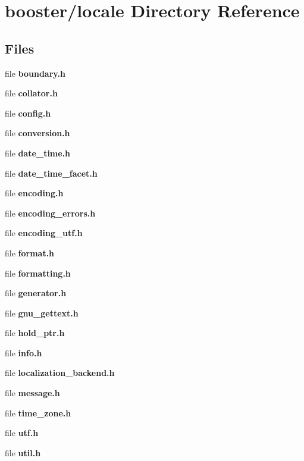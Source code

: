 \section{booster/locale Directory Reference}
\label{dir_16b7a13c3ac6af906251fa16860d5b07}
\subsection*{Files}
\begin{DoxyCompactItemize}
\item 
file {\bfseries boundary.\-h}
\item 
file {\bfseries collator.\-h}
\item 
file {\bfseries config.\-h}
\item 
file {\bfseries conversion.\-h}
\item 
file {\bfseries date\-\_\-time.\-h}
\item 
file {\bfseries date\-\_\-time\-\_\-facet.\-h}
\item 
file {\bfseries encoding.\-h}
\item 
file {\bfseries encoding\-\_\-errors.\-h}
\item 
file {\bfseries encoding\-\_\-utf.\-h}
\item 
file {\bfseries format.\-h}
\item 
file {\bfseries formatting.\-h}
\item 
file {\bfseries generator.\-h}
\item 
file {\bfseries gnu\-\_\-gettext.\-h}
\item 
file {\bfseries hold\-\_\-ptr.\-h}
\item 
file {\bfseries info.\-h}
\item 
file {\bfseries localization\-\_\-backend.\-h}
\item 
file {\bfseries message.\-h}
\item 
file {\bfseries time\-\_\-zone.\-h}
\item 
file {\bfseries utf.\-h}
\item 
file {\bfseries util.\-h}
\end{DoxyCompactItemize}
